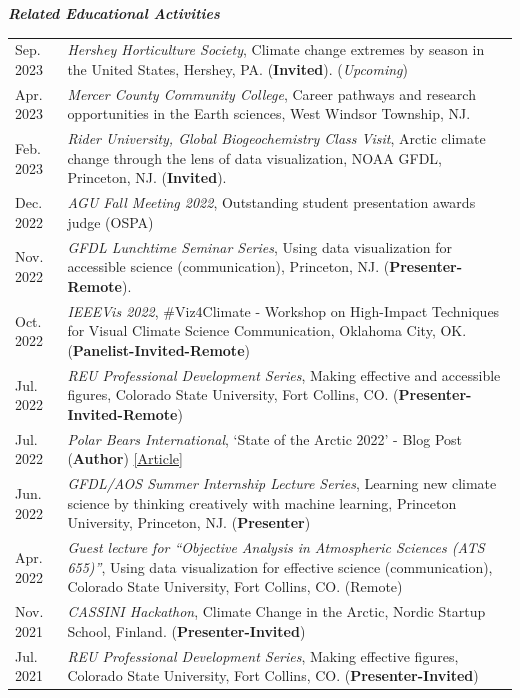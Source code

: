 \documentclass[margin,line,palatino,courier,10pt]{res}
\begin{document}
\begin{resume}
\textit{\textbf{Related Educational Activities}}
\vspace*{0.05in}\\
\begin{tabular}{@{}p{0.9in}p{4in}}
Sep. 2023 & \textit{Hershey Horticulture Society}, Climate change extremes by season in the United States, Hershey, PA. (\textbf{Invited}). (\textit{Upcoming})\\
Apr. 2023 & \textit{Mercer County Community College}, Career pathways and research opportunities in the Earth sciences, West Windsor Township, NJ.\\
Feb. 2023 & \textit{Rider University, Global Biogeochemistry Class Visit}, Arctic climate change through the lens of data visualization, NOAA GFDL, Princeton, NJ. (\textbf{Invited}).\\
Dec. 2022 & \textit{AGU Fall Meeting 2022}, Outstanding student presentation awards judge (OSPA)\\
Nov. 2022 & \textit{GFDL Lunchtime Seminar Series}, Using data visualization for accessible science (communication), Princeton, NJ. (\textbf{Presenter-Remote}).\\
Oct. 2022 & \textit{IEEEVis 2022}, \#Viz4Climate - Workshop on High-Impact Techniques for Visual Climate Science Communication, Oklahoma City, OK. (\textbf{Panelist-Invited-Remote})\\
Jul. 2022 & \textit{REU Professional Development Series}, Making effective and accessible figures, Colorado State University, Fort Collins, CO. (\textbf{Presenter-Invited-Remote})\\
Jul. 2022 & \textit{Polar Bears International}, `State of the Arctic 2022' - Blog Post (\textbf{Author}) \href{https://polarbearsinternational.org/news-media/articles/arctic-sea-ice-conditions-2022}{[Article]}\\
Jun. 2022 & \textit{GFDL/AOS Summer Internship Lecture Series}, Learning new climate science by thinking creatively with machine learning, Princeton University, Princeton, NJ. (\textbf{Presenter})\\
Apr. 2022 & \textit{Guest lecture for ``Objective Analysis in Atmospheric Sciences (ATS 655)''}, Using data visualization for effective science (communication), Colorado State University, Fort Collins, CO. (Remote)\\
Nov. 2021 & \textit{CASSINI Hackathon}, Climate Change in the Arctic, Nordic Startup School, Finland. (\textbf{Presenter-Invited})\\
Jul. 2021 & \textit{REU Professional Development Series}, Making effective figures, Colorado State University, Fort Collins, CO. (\textbf{Presenter-Invited})\\

\end{tabular}
\end{resume}
\end{document}
